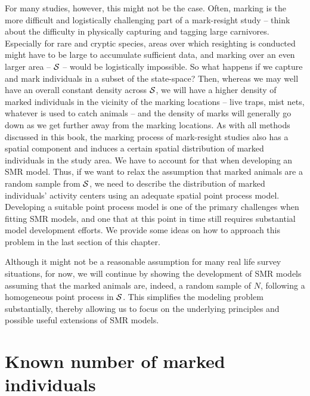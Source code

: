 For many studies, however, this might not be the
case. Often, marking is the more difficult and logistically
challenging part of a mark-resight study -- think about the difficulty in
physically capturing and tagging
large carnivores. Especially for rare and cryptic species, areas over
which resighting is conducted might have to be large to accumulate
sufficient data, and marking over an even larger area -- ${\cal S}$ --
would be logistically impossible.
So what happens if we capture and mark individuals in a subset of the
state-space? Then, whereas we may well have an overall constant density
across ${\cal S}$, we will have a higher density of marked individuals in the vicinity of the marking locations -- live
traps, mist nets, whatever is used to catch animals -- and the density of marks will generally go down as we get further away from the marking
locations. As with all methods discussed in this book, the marking process of mark-resight studies also has a spatial component and induces a certain spatial distribution of marked individuals in the study area. We have to account for that when developing an SMR model.
Thus, if we want to relax the assumption that marked animals are a random sample from ${\cal S}$, we need to describe the distribution of marked individuals' activity centers using an adequate spatial
point process model. Developing a suitable point process model is one of the primary
challenges when fitting SMR models, and one that at this point in time
still requires substantial model development efforts.
 We provide some ideas on how to approach this problem in the last section of
this chapter.

Although it might not be a reasonable assumption for many real life
survey situations, for now, we will continue by showing the development of
SMR models
assuming that the marked animals are, indeed, a random sample of $N$,
following a homogeneous point process in ${\cal S}$. This simplifies
the modeling problem substantially, thereby allowing us to focus on
the underlying principles and possible useful extensions of SMR
models.





\section{Known number of marked individuals}

